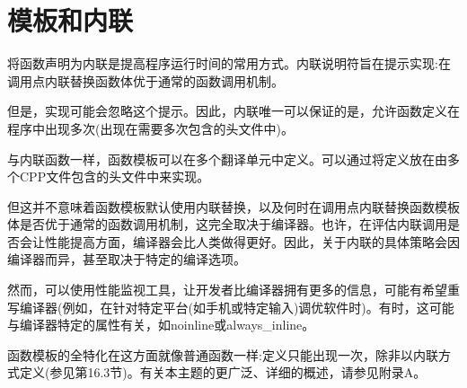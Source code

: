 \section{模板和内联}
将函数声明为内联是提高程序运行时间的常用方式。内联说明符旨在提示实现:在调用点内联替换函数体优于通常的函数调用机制。

但是，实现可能会忽略这个提示。因此，内联唯一可以保证的是，允许函数定义在程序中出现多次(出现在需要多次包含的头文件中)。

与内联函数一样，函数模板可以在多个翻译单元中定义。可以通过将定义放在由多个CPP文件包含的头文件中来实现。

但这并不意味着函数模板默认使用内联替换，以及何时在调用点内联替换函数模板体是否优于通常的函数调用机制，这完全取决于编译器。也许，在评估内联调用是否会让性能提高方面，编译器会比人类做得更好。因此，关于内联的具体策略会因编译器而异，甚至取决于特定的编译选项。

然而，可以使用性能监视工具，让开发者比编译器拥有更多的信息，可能有希望重写编译器(例如，在针对特定平台(如手机或特定输入)调优软件时)。有时，这可能与编译器特定的属性有关，如noinline或always\_inline。

函数模板的全特化在这方面就像普通函数一样:定义只能出现一次，除非以内联方式定义(参见第16.3节)。有关本主题的更广泛、详细的概述，请参见附录A。

























